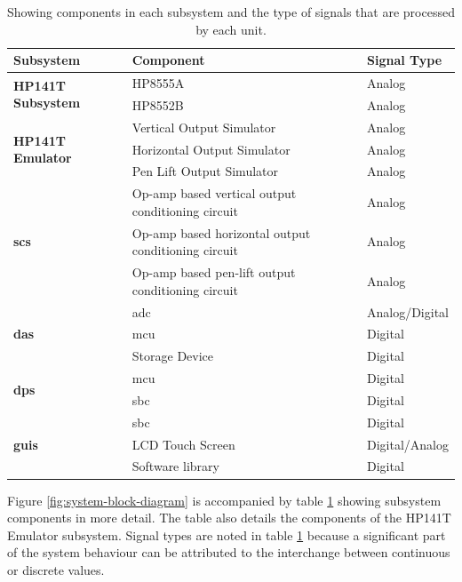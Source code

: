 \documentclass[class=report,11pt,crop=false]{standalone}
\begin{document}
	\begin{table}[ht!]
		\centering
		\label{tab:subsystem-components}
		\begin{tabular}{|m{18em}|m{15em}|m{8em}|}
			\hline
			\textbf{Subsystem}	&\textbf{Component}	& \textbf{Signal Type}\\
			\hline
			\multirow{2}{*}{\textbf{HP141T Subsystem}}	& HP8555A	& Analog\\
			\cline{2-3}
														& HP8552B	& Analog\\
			\hline
			\multirow{3}{*}{\textbf{HP141T Emulator}}	& Vertical Output Simulator	& Analog\\
			\cline{2-3}
														& Horizontal Output Simulator & Analog\\
			\cline{2-3}
														& Pen Lift Output Simulator	& Analog\\
			\hline
			\multirow{3}{*}{\textbf{\acrlong{scs}}}	& Op-amp based vertical output conditioning circuit													& Analog\\
			\cline{2-3}
														& Op-amp based horizontal output conditioning circuit		& Analog\\
			\cline{2-3}
														& Op-amp based pen-lift output conditioning circuit 	& Analog\\
			\hline
			\multirow{3}{*}{\textbf{\acrlong{das}}}	& \acrshort{adc} & Analog/Digital\\
			\cline{2-3}
														& \acrshort{mcu} & Digital\\
			\cline{2-3}
														& Storage Device & Digital\\
			\hline
			\multirow{2}{*}{\textbf{\acrlong{dps}}}	& \acrshort{mcu} & Digital\\
			\cline{2-3}
														& \acrshort{sbc} & Digital\\
			\hline
			\multirow{3}{*}{\textbf{\acrlong{guis}}}	& \acrshort{sbc} & Digital\\
			\cline{2-3}
														& LCD Touch Screen & Digital/Analog\\
			\cline{2-3}
														& Software library & Digital \\
			\hline
		\end{tabular}
		\caption{Showing components in each subsystem and the type of signals that are processed by each unit.}
	\end{table}

	Figure \ref{fig:system-block-diagram} is accompanied by table \ref{tab:subsystem-components} showing subsystem components in more detail. The table also details the components of the HP141T Emulator subsystem. Signal types are noted in table \ref{tab:subsystem-components} because a significant part of the system behaviour can be attributed to the interchange between continuous or discrete values. 
	
\end{document}

